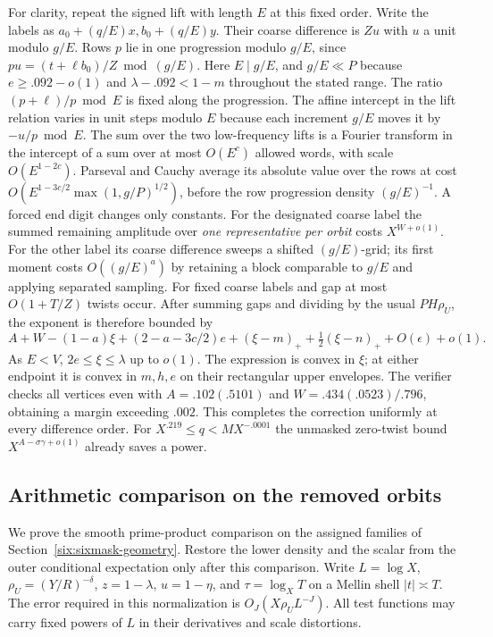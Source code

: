 \documentclass[11pt,a4paper]{article}
\theoremstyle{paperplain}
\numberwithin{equation}{section}
\begin{document}
For clarity, repeat the signed lift with length $E$ at this fixed
order. Write the labels as $a_0+(q/E)x,b_0+(q/E)y$. Their coarse
difference is $Zu$ with $u$ a unit modulo $g/E$. Rows $p$ lie in
one progression modulo $g/E$, since
$p u=(t+\ell b_0)/Z\bmod (g/E)$. Here $E\mid g/E$,
and $g/E\ll P$ because $e\ge.092-o(1)$ and
$\lambda-.092<1-m$ throughout the stated range. The ratio
$(p+\ell)/p\bmod E$ is fixed along the progression. The affine
intercept in the lift relation varies in unit steps modulo $E$
because each increment $g/E$ moves it by $-u/p\bmod E$.
The sum over the two low-frequency lifts is a Fourier transform
in the intercept of a sum over at most $O(E^c)$ allowed words,
with scale $O(E^{1-2c})$. Parseval and Cauchy average its absolute
value over the rows at cost
$O(E^{1-3c/2}\max(1,g/P)^{1/2})$, before the row progression
density $(g/E)^{-1}$. A forced end digit changes only constants.
For the designated coarse label the summed remaining amplitude
over \emph{one representative per orbit} costs $X^{W+o(1)}$.
For the other label its coarse difference sweeps a shifted
$(g/E)$-grid; its first moment costs $O((g/E)^a)$ by retaining
a block comparable to $g/E$ and applying separated sampling.
For fixed coarse labels and gap at most $O(1+T/Z)$ twists occur.
After summing gaps and dividing by the usual $PH\rho_U$, the
exponent is therefore bounded by
\[
 A+W-(1-a)\xi+(2-a-3c/2)e
              +(\xi-m)_++\tfrac12(\xi-n)_++O(\epsilon)+o(1).
\]
As $E<V$, $2e\le\xi\le\lambda$ up to $o(1)$. The expression is
convex in $\xi$; at either endpoint it is convex in $m,h,e$ on
their rectangular upper envelopes. The verifier checks all vertices
even with $A=.102(.5101)$ and $W=.434(.0523)/.796$, obtaining a
margin exceeding $.002$. This completes the correction uniformly
at every difference order. For $X^{.219}\le q< MX^{-.0001}$ the
unmasked zero-twist bound $X^{A-\sigma\gamma+o(1)}$ already saves
a power.

\subsection{Arithmetic comparison on the removed orbits}
\label{six:sixmask-mellin}
We prove the smooth prime-product comparison on the assigned
families of Section~\ref{six:sixmask-geometry}. Restore the lower density
and the scalar from the outer conditional expectation only after
this comparison. Write $L=\log X$, $\rho_U=(Y/R)^{-\delta}$,
$z=1-\lambda$, $u=1-\eta$, and $\tau=\log_X T$ on a Mellin
shell $|t|\asymp T$. The error required in this normalization
is $O_J(X\rho_U L^{-J})$. All test functions may carry fixed
powers of $L$ in their derivatives and scale distortions.
\end{document}
